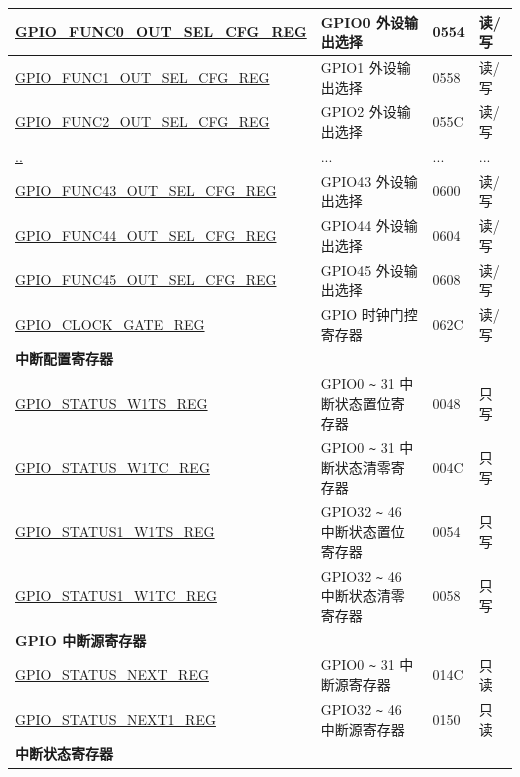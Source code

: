 \begin{longtable}{ | p{6cm} | p{7.2cm} | p{1.3cm} | p{1cm} | }
\hyperref[regdesc:GPIOFUNCNOUTSELCFGREG]{GPIO\_FUNC0\_OUT\_SEL\_CFG\_REG} & GPIO0 外设输出选择 & \hexprefix{}0554 & 读/写 \\ \hline
\hyperref[regdesc:GPIOFUNCNOUTSELCFGREG]{GPIO\_FUNC1\_OUT\_SEL\_CFG\_REG} & GPIO1 外设输出选择 & \hexprefix{}0558 & 读/写 \\ \hline
\hyperref[regdesc:GPIOFUNCNOUTSELCFGREG]{GPIO\_FUNC2\_OUT\_SEL\_CFG\_REG} & GPIO2 外设输出选择 & \hexprefix{}055C & 读/写 \\ \hline
\hyperref[regdesc:GPIOFUNCNOUTSELCFGREG]{..} & ... & ... & ... \\ \hline
\hyperref[regdesc:GPIOFUNCNOUTSELCFGREG]{GPIO\_FUNC43\_OUT\_SEL\_CFG\_REG} & GPIO43 外设输出选择 & \hexprefix{}0600 & 读/写 \\ \hline
\hyperref[regdesc:GPIOFUNCNOUTSELCFGREG]{GPIO\_FUNC44\_OUT\_SEL\_CFG\_REG} & GPIO44 外设输出选择 & \hexprefix{}0604 & 读/写 \\ \hline
\hyperref[regdesc:GPIOFUNCNOUTSELCFGREG]{GPIO\_FUNC45\_OUT\_SEL\_CFG\_REG} & GPIO45 外设输出选择 & \hexprefix{}0608 & 读/写 \\ \hline
\hyperref[regdesc:GPIOCLOCKGATEREG]{GPIO\_CLOCK\_GATE\_REG} & GPIO 时钟门控寄存器 & \hexprefix{}062C & 读/写 \\ \hline
\multicolumn{4}{|l|}{\textbf{中断配置寄存器}} \\ \hline
\hyperref[regdesc:GPIOSTATUSW1TSREG]{GPIO\_STATUS\_W1TS\_REG} & GPIO0 \verb+~+ 31 中断状态置位寄存器 & \hexprefix{}0048 & 只写 \\ \hline
\hyperref[regdesc:GPIOSTATUSW1TCREG]{GPIO\_STATUS\_W1TC\_REG} & GPIO0 \verb+~+ 31 中断状态清零寄存器 & \hexprefix{}004C & 只写 \\ \hline
\hyperref[regdesc:GPIOSTATUS1W1TSREG]{GPIO\_STATUS1\_W1TS\_REG} & GPIO32 \verb+~+ 46 中断状态置位寄存器 & \hexprefix{}0054 & 只写 \\ \hline
\hyperref[regdesc:GPIOSTATUS1W1TCREG]{GPIO\_STATUS1\_W1TC\_REG} & GPIO32 \verb+~+ 46 中断状态清零寄存器 & \hexprefix{}0058 & 只写 \\ \hline
\multicolumn{4}{|l|}{\textbf{GPIO 中断源寄存器}} \\ \hline
\hyperref[regdesc:GPIOSTATUSNEXTREG]{GPIO\_STATUS\_NEXT\_REG} & GPIO0 \verb+~+ 31 中断源寄存器 & \hexprefix{}014C & 只读 \\ \hline
\hyperref[regdesc:GPIOSTATUSNEXT1REG]{GPIO\_STATUS\_NEXT1\_REG} & GPIO32 \verb+~+ 46 中断源寄存器 & \hexprefix{}0150 & 只读 \\ \hline
\multicolumn{4}{|l|}{\textbf{中断状态寄存器}} \\ \hline

\end{longtable}
